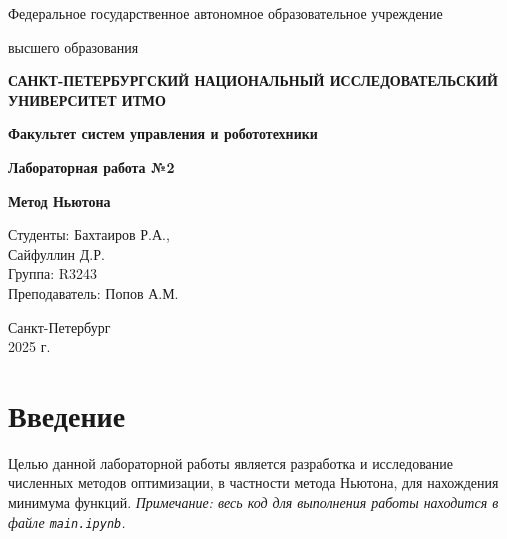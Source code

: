 \documentclass[a4paper,12pt]{article}
\begin{document}
    

\begin{titlepage}
    \centering
    {\large Федеральное государственное автономное образовательное учреждение\par}
    {\large высшего образования\par}
    {\bfseries САНКТ-ПЕТЕРБУРГСКИЙ НАЦИОНАЛЬНЫЙ ИССЛЕДОВАТЕЛЬСКИЙ УНИВЕРСИТЕТ ИТМО\par}
    {\bfseries Факультет систем управления и робототехники\par}
    \vfill
    {\Large \bfseries Лабораторная работа №2\par}
    {\Large \bfseries Метод Ньютона \par}
    \vfill
    
    \begin{flushright}
        Студенты: Бахтаиров Р.А.,\\ Сайфуллин Д.Р. \\
        Группа:  R3243\\
        Преподаватель: Попов А.М.
    \end{flushright}
    \vfill
    Санкт-Петербург\\ 
    2025 г.
\end{titlepage}

\section{Введение}
Целью данной лабораторной работы является разработка и исследование численных методов оптимизации, в частности метода Ньютона, для нахождения минимума функций.
\textit{Примечание: весь код для выполнения работы находится в файле \texttt{main.ipynb}.}
\end{document}
